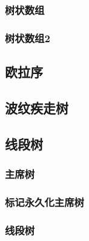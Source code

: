 \documentclass{article}
\begin{document}
\begin{multicols*}{2}
\subsubsection{树状数组}
\begin{small}

\end{small}

\subsubsection{树状数组2}
\begin{small}

\end{small}

\subsection{欧拉序}

\subsection{波纹疾走树}
\begin{small}

\end{small}

\subsection{线段树}
\subsubsection{主席树}
\begin{small}

\end{small}

\subsubsection{标记永久化主席树}
\begin{small}

\end{small}

\subsubsection{线段树}
\begin{small}

\end{small}


\end{multicols*}
\end{document}
